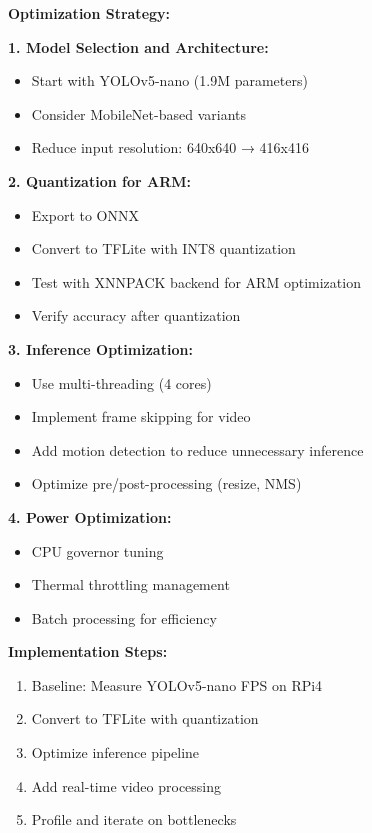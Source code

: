 \textbf{Optimization Strategy:}

\textbf{1. Model Selection and Architecture:}
\begin{itemize}
    \item Start with YOLOv5-nano (1.9M parameters)
    \item Consider MobileNet-based variants
    \item Reduce input resolution: 640x640 → 416x416
\end{itemize}

\textbf{2. Quantization for ARM:}
\begin{itemize}
    \item Export to ONNX
    \item Convert to TFLite with INT8 quantization
    \item Test with XNNPACK backend for ARM optimization
    \item Verify accuracy after quantization
\end{itemize}

\textbf{3. Inference Optimization:}
\begin{itemize}
    \item Use multi-threading (4 cores)
    \item Implement frame skipping for video
    \item Add motion detection to reduce unnecessary inference
    \item Optimize pre/post-processing (resize, NMS)
\end{itemize}

\textbf{4. Power Optimization:}
\begin{itemize}
    \item CPU governor tuning
    \item Thermal throttling management
    \item Batch processing for efficiency
\end{itemize}

\textbf{Implementation Steps:}
\begin{enumerate}
    \item Baseline: Measure YOLOv5-nano FPS on RPi4
    \item Convert to TFLite with quantization
    \item Optimize inference pipeline
    \item Add real-time video processing
    \item Profile and iterate on bottlenecks
\end{enumerate}

